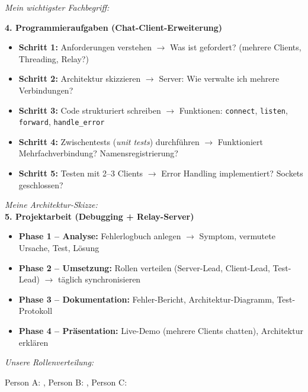 \begin{mainBox}[title=Methodische Anleitung zur Durchführung der Prüfungsaufgaben]
    \textit{Mein wichtigster Fachbegriff:} \underline{\hspace{8cm}}

    \textbf{\large 4. Programmieraufgaben (Chat-Client-Erweiterung)}
    \begin{itemize}[topsep=2pt, itemsep=2pt]
        \item \textbf{Schritt 1:} Anforderungen verstehen $\rightarrow$ Was ist gefordert? (mehrere Clients, Threading, Relay?)
        \item \textbf{Schritt 2:} Architektur skizzieren $\rightarrow$ Server: Wie verwalte ich mehrere Verbindungen?
        \item \textbf{Schritt 3:} Code strukturiert schreiben $\rightarrow$ Funktionen: \texttt{connect}, \texttt{listen}, \texttt{forward}, \texttt{handle\_error}
        \item \textbf{Schritt 4:} Zwischentests (\textit{unit tests}) durchführen $\rightarrow$ Funktioniert Mehrfachverbindung? Namensregistrierung?
        \item \textbf{Schritt 5:} Testen mit 2–3 Clients $\rightarrow$ Error Handling implementiert? Sockets geschlossen?
    \end{itemize}

    \textit{Meine Architektur-Skizze:} \\
    \vspace{5cm}
    \newpage
    \textbf{\large 5. Projektarbeit (Debugging + Relay-Server)}
    \begin{itemize}[topsep=2pt, itemsep=2pt]
        \item \textbf{Phase 1 – Analyse:} Fehlerlogbuch anlegen $\rightarrow$ Symptom, vermutete Ursache, Test, Lösung
        \item \textbf{Phase 2 – Umsetzung:} Rollen verteilen (Server-Lead, Client-Lead, Test-Lead) $\rightarrow$ täglich synchronisieren
        \item \textbf{Phase 3 – Dokumentation:} Fehler-Bericht, Architektur-Diagramm, Test-Protokoll
        \item \textbf{Phase 4 – Präsentation:} Live-Demo (mehrere Clients chatten), Architektur erklären
    \end{itemize}

    \textit{Unsere Rollenverteilung:} 
    
    Person A: \underline{\hspace{2.5cm}}, Person B: \underline{\hspace{2.5cm}}, Person C: \underline{\hspace{2.5cm}}


\end{mainBox}
